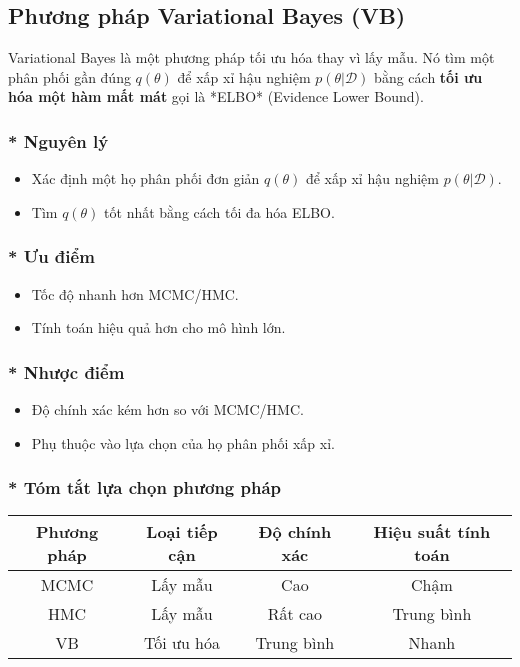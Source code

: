 \subsection{Phương pháp Variational Bayes (VB)}
Variational Bayes là một phương pháp tối ưu hóa thay vì lấy mẫu. Nó tìm một phân phối gần đúng $q(\theta)$ để xấp xỉ hậu nghiệm $p(\theta | \mathcal{D})$ bằng cách \textbf{tối ưu hóa một hàm mất mát} gọi là *ELBO* (Evidence Lower Bound).

\subsubsection{* Nguyên lý}  
\begin{itemize}
    \item Xác định một họ phân phối đơn giản $q(\theta)$ để xấp xỉ hậu nghiệm $p(\theta | \mathcal{D})$.
    \item Tìm $q(\theta)$ tốt nhất bằng cách tối đa hóa ELBO.
\end{itemize}

\subsubsection{* Ưu điểm}
\begin{itemize}
    \item Tốc độ nhanh hơn MCMC/HMC.
    \item Tính toán hiệu quả hơn cho mô hình lớn.
\end{itemize}

\subsubsection{* Nhược điểm}
\begin{itemize}
    \item Độ chính xác kém hơn so với MCMC/HMC.
    \item Phụ thuộc vào lựa chọn của họ phân phối xấp xỉ.
\end{itemize}

\subsubsection{* Tóm tắt lựa chọn phương pháp}
\begin{center}
    \begin{tabular}{|c|c|c|c|}
        \hline
        \textbf{Phương pháp} & \textbf{Loại tiếp cận} & \textbf{Độ chính xác} & \textbf{Hiệu suất tính toán} \\
        \hline
        MCMC & Lấy mẫu & Cao & Chậm \\
        \hline
        HMC & Lấy mẫu & Rất cao & Trung bình \\
        \hline
        VB & Tối ưu hóa & Trung bình & Nhanh \\
        \hline
    \end{tabular}
\end{center}

